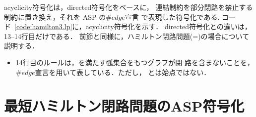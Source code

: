 \textsf{acyclicity}符号化は，\textsf{directed}符号化をベースに，
連結制約を部分閉路を禁止する制約に置き換え，それを ASP の$\#edge$宣言
で表現した符号化である.
コード~\ref{code:hamilton3.lp}に，\textsf{acyclicity}符号化を示す．
\textsf{directed}符号化との違いは，13--14行目だけである．
前節と同様に，ハミルトン閉路問題(=)の場合について説明する．

\begin{itemize}
\item  14行目のルールは，を満たす弧集合をもつグラフが閉
  路を含まないことを，$\#edge$宣言を用いて表している．ただし，
  とは始点ではない．
\end{itemize}

\section{最短ハミルトン閉路問題のASP符号化}\label{minexpl}



